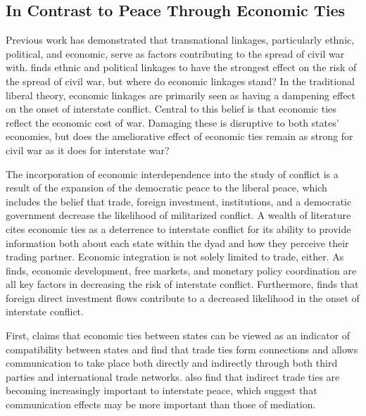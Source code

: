 \documentclass[12pt,letterpaper]{article}
\begin{document}

\subsection*{In Contrast to Peace Through Economic Ties}

Previous work has demonstrated that transnational linkages, particularly ethnic, political, and economic, serve as factors contributing to the spread of civil war with. \citet{Gleditsch2007} finds ethnic and political linkages to have the strongest effect on the risk of the spread of civil war, but where do economic linkages stand? In the traditional liberal theory, economic linkages are primarily seen as having a dampening effect on the onset of interstate conflict. Central to this belief is that economic ties reflect the economic cost of war. Damaging these is disruptive to both states' economies, but does the ameliorative effect of economic ties remain as strong for civil war as it does for interstate war? 

The incorporation of economic interdependence into the study of conflict is a result of the expansion of the democratic peace to the liberal peace, which includes the belief that trade, foreign investment, institutions, and a democratic government decrease the likelihood of militarized conflict. A wealth of literature cites economic ties as a deterrence to interstate conflict for its ability to provide information both about each state within the dyad and how they perceive their trading partner. Economic integration is not solely limited to trade, either. As \citet{Gartzke2007} finds, economic development, free markets, and monetary policy coordination are all key factors in decreasing the risk of interstate conflict. Furthermore, \citet{Bussmann2010} finds that foreign direct investment flows contribute to a decreased likelihood in the onset of interstate conflict. 

First, \citet{Gleditsch2007} claims that economic ties between states can be viewed as an indicator of compatibility between states and \citet{DorussenWard2010} find that trade ties form connections and allows communication to take place both directly and indirectly through both third parties and international trade networks. \citet{DorussenWard2010} also find that indirect trade ties are becoming increasingly important to interstate peace, which suggest that communication effects may be more important than those of mediation.
\end{document}
